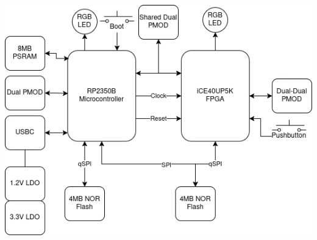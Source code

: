  
\begin{DoxyImageNoCaption}
  \mbox{\includegraphics[width=\textwidth,height=\textheight/2,keepaspectratio=true]{pico2_ice_blocks.webp}}
\end{DoxyImageNoCaption}
    